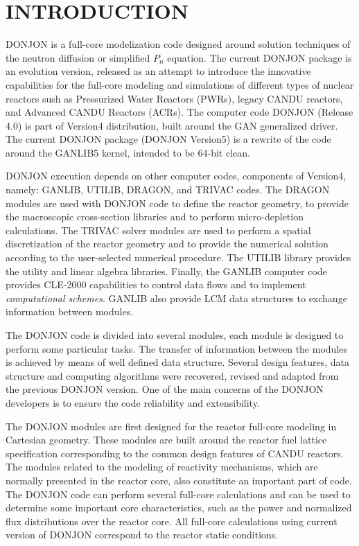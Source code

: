 \section{INTRODUCTION}\label{sect:intro}

DONJON is a full-core modelization code designed around solution techniques of 
the neutron diffusion or simplified $P_n$ equation.\cite{PIP2009}
The current DONJON package is an evolution version, released as an attempt
to introduce the innovative capabilities for the full-core modeling and simulations
of different types of nuclear reactors sush as Pressurized Water Reactors (PWRs),
legacy CANDU reactors, and Advanced CANDU Reactors (ACRs). The computer code DONJON (Release 4.0)
is part of Version4 distribution\cite{v4}, built around the GAN generalized driver\cite{gan1}.
The current DONJON package (DONJON Version5) is a rewrite of the code around the GANLIB5
kernel\cite{ganlib5}, intended to be 64-bit clean.

DONJON execution depends on other computer codes, components of Version4,
namely: GANLIB, UTILIB, DRAGON\cite{dragon}, and TRIVAC\cite{trivac}
codes. The DRAGON modules are used with DONJON code to define the reactor
geometry, to provide the macroscopic cross-section libraries and to perform
micro-depletion calculations. The TRIVAC
solver modules are used to perform a spatial discretization of the reactor geometry
and to provide the numerical solution according to the user-selected numerical
procedure\cite{ah1,ah2,ah3,ah4,ah5,ah6}.
The UTILIB library provides the utility and linear algebra libraries.
Finally, the GANLIB computer code provides CLE-2000 capabilities to control
data flows and to implement {\sl computational schemes}. GANLIB also provide
LCM data structures to exchange information between modules.

The DONJON code is divided into several modules, each module is designed
to perform some particular tasks. The transfer of information between the modules
is achieved by means of well defined data structure. Several design features,
data structure and computing algorithms were recovered, revised and adapted
from the previous DONJON version\cite{donjon,donjstruc}. One of the main
concerns of the DONJON developers is to ensure the code reliability and extensibility.

The DONJON modules are first designed for the reactor full-core modeling in
 Cartesian geometry. These modules are built around the reactor fuel
lattice specification corresponding to the common design features of CANDU
reactors. The modules related to the modeling of reactivity mechanisms, which are
normally presented in the reactor core, also constitute an important part of code.
The DONJON code can perform several full-core calculations and can be used
to determine some important core characteristics, such as the power and normalized
flux distributions over the reactor core. All full-core calculations using current version
of DONJON correspond to the reactor static conditions.

